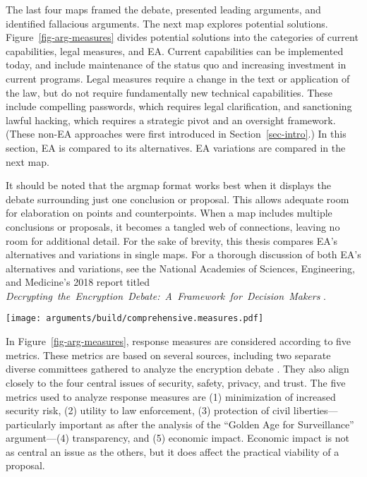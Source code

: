 \documentclass{IEEEtran}
\def\ii#1{\mbox{\textit{#1}}}
\newcommand{\myfig}[1]{Figure~\ref{#1}}
\newcommand{\mysec}[1]{Section~\ref{#1}}
\begin{document}
The last four maps framed the debate, presented leading arguments, and identified fallacious arguments. The next map
explores potential solutions. \myfig{fig-arg-measures} divides potential solutions into the categories of current
capabilities, legal measures, and \ac{EA}. Current capabilities can be implemented today, and include maintenance of the
status quo and increasing investment in current programs. Legal measures require a change in the text or application of
the law, but do not require fundamentally new technical capabilities. These include compelling passwords, which requires
legal clarification, and sanctioning lawful hacking, which requires a strategic pivot and an oversight framework. (These
non-\ac{EA} approaches were first introduced in \mysec{sec-intro}.) In this section, \ac{EA} is compared to its
alternatives. \ac{EA} variations are compared in the next map.


It should be noted that the \ac{argmap} format works best when it displays the debate surrounding just one conclusion or
proposal. This allows adequate room for elaboration on points and counterpoints. When a map includes multiple
conclusions or proposals, it becomes a tangled web of connections, leaving no room for additional detail. For the sake
of brevity, this thesis compares \ac{EA}'s alternatives and variations in single maps. For a thorough discussion of both
\ac{EA}'s alternatives and variations, see the National Academies of Sciences, Engineering, and Medicine's 2018 report
titled \ii{Decrypting the Encryption Debate: A Framework for Decision Makers} \cite{committee_decrypting_2018}.

\begin{sidewaysfigure*}
  \centering
  \texttt{[image: arguments/build/comprehensive.measures.pdf]}
  \caption{EA and its Alternatives}
  \label{fig-arg-measures}
\end{sidewaysfigure*}

In \myfig{fig-arg-measures}, response measures are considered according to five metrics. These metrics are based on
several sources, including two separate diverse committees gathered to analyze the encryption debate
\cite{committee_decrypting_2018} \cite{group_2019} \cite{varia_2018}. They also align closely to the four central issues
of security, safety, privacy, and trust. The five metrics used to analyze response measures are (1) minimization of
increased security risk, (2) utility to law enforcement, (3) protection of civil liberties---particularly important as
after the analysis of the ``Golden Age for Surveillance'' argument---(4) transparency, and (5) economic impact. Economic
impact is not as central an issue as the others, but it does affect the practical viability of a proposal.
\end{document}
